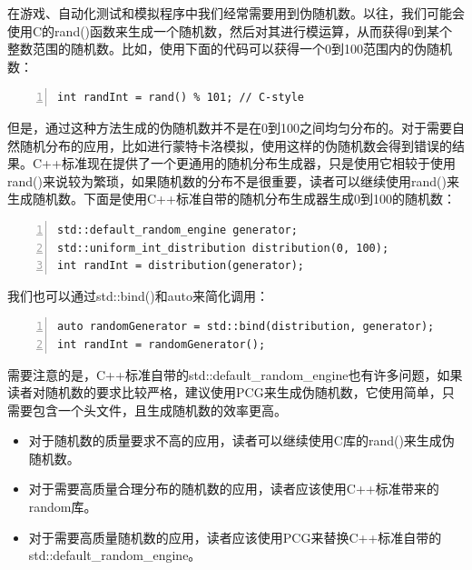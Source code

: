 \documentclass{ctexart}
\begin{document}
在游戏、自动化测试和模拟程序中我们经常需要用到伪随机数。以往，我们可能会使用C的rand()函数来生成一个随机数，然后对其进行模运算，从而获得0到某个整数范围的随机数。比如，使用下面的代码可以获得一个0到100范围内的伪随机数：

\begin{lstlisting}[language={[ANSI]C},keywordstyle=\color{blue!70},commentstyle=\color{red!50!green!50!blue!50},frame=shadowbox, rulesepcolor=\color{red!20!green!20!blue!20},basicstyle=\small,numbers=left, numberstyle=\tiny,breaklines=true]
int randInt = rand() % 101; // C-style
\end{lstlisting}

但是，通过这种方法生成的伪随机数并不是在0到100之间均匀分布的。对于需要自然随机分布的应用，比如进行蒙特卡洛模拟，使用这样的伪随机数会得到错误的结果。C++标准现在提供了一个更通用的随机分布生成器，只是使用它相较于使用rand()来说较为繁琐，如果随机数的分布不是很重要，读者可以继续使用rand()来生成随机数。下面是使用C++标准自带的随机分布生成器生成0到100的随机数：

\begin{lstlisting}[language={[ANSI]C},keywordstyle=\color{blue!70},commentstyle=\color{red!50!green!50!blue!50},frame=shadowbox, rulesepcolor=\color{red!20!green!20!blue!20},basicstyle=\small,numbers=left, numberstyle=\tiny,breaklines=true]
std::default_random_engine generator;  
std::uniform_int_distribution distribution(0, 100);  
int randInt = distribution(generator);
\end{lstlisting}

我们也可以通过std::bind()和auto来简化调用：

\begin{lstlisting}[language={[ANSI]C},keywordstyle=\color{blue!70},commentstyle=\color{red!50!green!50!blue!50},frame=shadowbox, rulesepcolor=\color{red!20!green!20!blue!20},basicstyle=\small,numbers=left, numberstyle=\tiny,breaklines=true]
auto randomGenerator = std::bind(distribution, generator);
int randInt = randomGenerator();
\end{lstlisting}

需要注意的是，C++标准自带的std::default\_random\_engine也有许多问题，如果读者对随机数的要求比较严格，建议使用PCG来生成伪随机数，它使用简单，只需要包含一个头文件，且生成随机数的效率更高。

\begin{itemize}
	\item 对于随机数的质量要求不高的应用，读者可以继续使用C库的rand()来生成伪随机数。
	\item 对于需要高质量合理分布的随机数的应用，读者应该使用C++标准带来的random库。
	\item 对于需要高质量随机数的应用，读者应该使用PCG来替换C++标准自带的std::default\_random\_engine。
\end{itemize}
\end{document}
